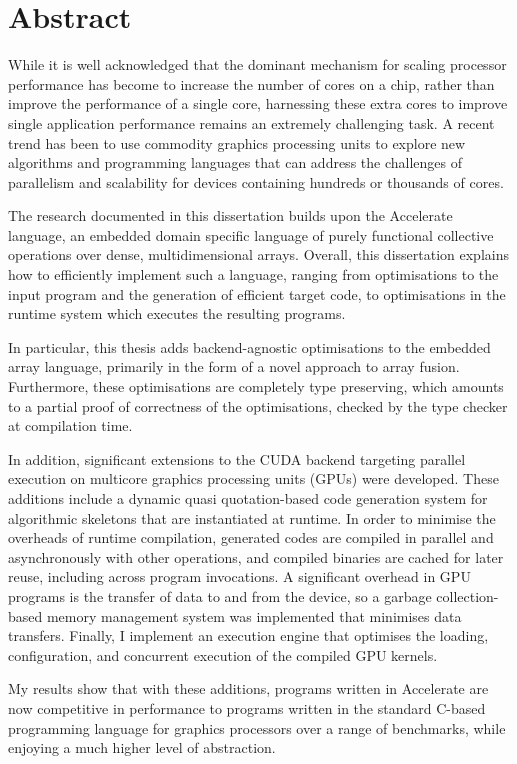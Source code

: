 
\chapter{Abstract}

While it is well acknowledged that the dominant mechanism for scaling processor
performance has become to increase the number of cores on a chip, rather than
improve the performance of a single core, harnessing these extra cores to
improve single application performance remains an extremely challenging task. A
recent trend has been to use commodity graphics processing units to explore new
algorithms and programming languages that can address the challenges of
parallelism and scalability for devices containing hundreds or thousands of
cores.

The research documented in this dissertation builds upon the Accelerate
language, an embedded domain specific language of purely functional collective
operations over dense, multidimensional arrays. Overall, this dissertation
explains how to efficiently implement such a language, ranging from
optimisations to the input program and the generation of efficient target code,
to optimisations in the runtime system which executes the resulting programs.

In particular, this thesis adds backend-agnostic optimisations to the embedded
array language, primarily in the form of a novel approach to array fusion.
Furthermore, these optimisations are completely type preserving, which amounts
to a partial proof of correctness of the optimisations, checked by the type
checker at compilation time.

In addition, significant extensions to the CUDA backend targeting parallel
execution on multicore graphics processing units (GPUs) were developed. These
additions include a dynamic quasi quotation-based code generation system for
algorithmic skeletons that are instantiated at runtime. In order to minimise the
overheads of runtime compilation, generated codes are compiled in parallel and
asynchronously with other operations, and compiled binaries are cached for later
reuse, including across program invocations. A significant overhead in GPU
programs is the transfer of data to and from the device, so a garbage
collection-based memory management system was implemented that minimises data
transfers. Finally, I implement an execution engine that optimises the loading,
configuration, and concurrent execution of the compiled GPU kernels.

My results show that with these additions, programs written in Accelerate are
now competitive in performance to programs written in the standard C-based
programming language for graphics processors over a range of benchmarks, while
enjoying a much higher level of abstraction.


